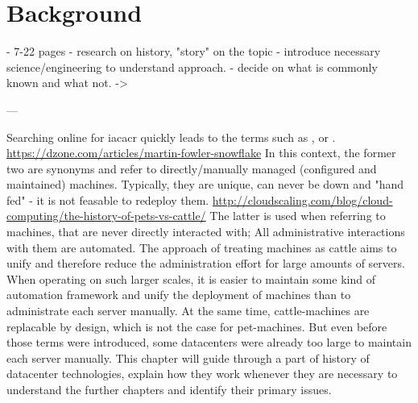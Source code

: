 \chapter{Background}

- 7-22 pages
- research on history, "story" on the topic
- introduce necessary science/engineering to understand approach.
  - decide on what is commonly known and what not. -> %

---


Searching online for \gls{iacacr} quickly leads to the terms such as ,  or . \url{https://dzone.com/articles/martin-fowler-snowflake}
In this context, the former two are synonyms and refer to directly/manually managed (configured and maintained) machines. Typically, they are unique, can never be down and "hand fed" - it is not feasable to redeploy them. \url{http://cloudscaling.com/blog/cloud-computing/the-history-of-pets-vs-cattle/} The latter is used when referring to machines, that are never directly interacted with; All administrative interactions with them are automated.
The approach of treating machines as cattle aims to unify and therefore reduce the administration effort for large amounts of servers. When operating on such larger scales, it is easier to maintain some kind of automation framework and unify the deployment of machines than to administrate each server manually. At the same time, cattle-machines are replacable by design, which is not the case for pet-machines.
But even before those terms were introduced, some datacenters were already too large to maintain each server manually.
This chapter will guide through a part of history of datacenter technologies, explain how they work whenever they are necessary to understand the further chapters and identify their primary issues.


